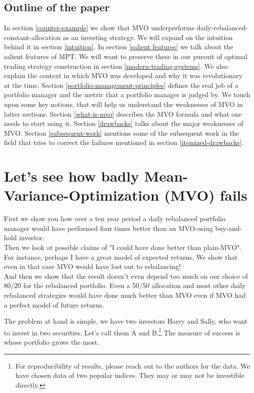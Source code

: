 \documentclass[a4paper]{article}
\begin{document}
\subsection{Outline of the paper}
In section \ref{counter-example} we show that MVO underperforms daily-rebalanced-constant-allocation as an investing strategy. We will expand on the intuition behind it in section \ref{intuition}. In section \ref{salient features} we talk about the salient features of MPT. We will want to preserve these in our pursuit of optimal trading strategy construction in section \ref{modern-trading-systems}. We also explain the context in which MVO was developed and why it was revolutionary at the time. Section \ref{portfolio-management-principles} defines the real job of a portfolio manager and the metric that a portfolio manager is judged by. We touch upon some key notions, that will help us understand the weaknesses of MVO in latter sections. Section \ref{what-is-mvo} describes the MVO formula and what one needs to start using it. Section \ref{drawbacks} talks about the major weaknesses of MVO. Section \ref{subsequent-work} mentions some of the subsequent work in the field that tries to correct the failures mentioned in section \ref{itemized-drawbacks}.


\section{Let’s see how badly Mean-Variance-Optimization (MVO) fails\label{counter-example}} 
First we show you how over a ten year period a daily rebalanced portfolio manager would have performed four times better than an MVO-using buy-and-hold investor. \\ Then we look at possible claims of "I could have done better than plain-MVO". For instance, perhaps I have a great model of expected returns. We show that even in that case MVO would have lost out to rebalancing! \\ And then we show that the result doesn't even depend too much on our choice of 80/20 for the rebalanced portfolio. Even a 50/50 allocation and most other daily rebalanced strategies would have done much better than MVO even if MVO had a perfect model of future returns.

The problem at hand is simple, we have two investors Harry and Sally, who want to invest in two securities. Let's call them A and B.\footnote{For reproducibility of results, please reach out to the authors for the data. We have chosen data of two popular indices. They may or may not be investible directly.} The measure of success is whose portfolio grows the most.
\end{document}
